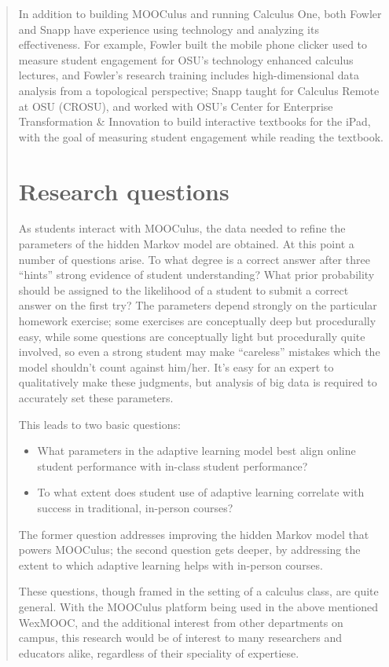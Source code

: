 \documentclass[12pt]{article}
\begin{document}
\begin{quote}
In addition to building MOOCulus and running Calculus One, both Fowler
and Snapp have experience using technology and analyzing its
effectiveness.  For example, Fowler built the mobile phone clicker
used to measure student engagement for OSU's technology enhanced
calculus lectures, and Fowler's research training includes
high-dimensional data analysis from a topological perspective; Snapp
taught for Calculus Remote at OSU (CROSU), and worked with OSU's
Center for Enterprise Transformation \& Innovation to build
interactive textbooks for the iPad, with the goal of measuring student
engagement while reading the textbook.

\section{Research questions}

As students interact with MOOCulus, the data needed to refine the
parameters of the hidden Markov model are obtained.  At this point a
number of questions arise. To what degree is a correct answer after
three ``hints'' strong evidence of student understanding?  What prior
probability should be assigned to the likelihood of a student to
submit a correct answer on the first try?  The parameters depend
strongly on the particular homework exercise; some exercises are
conceptually deep but procedurally easy, while some questions are
conceptually light but procedurally quite involved, so even a strong
student may make ``careless'' mistakes which the model shouldn't count
against him/her.  It's easy for an expert to qualitatively make these
judgments, but analysis of big data is required to accurately set
these parameters.

This leads to two basic questions:
\begin{itemize}
\item What parameters in the adaptive learning model best align online
  student performance with in-class student performance?
\item To what extent does student use of adaptive learning correlate
  with success in traditional, in-person courses?
\end{itemize}
The former question addresses improving the hidden Markov model that
powers MOOCulus; the second question gets deeper, by addressing the
extent to which adaptive learning helps with in-person courses.

These questions, though framed in the setting of a calculus class, are
quite general. With the MOOCulus platform being used in the above
mentioned WexMOOC, and the additional interest from other departments
on campus, this research would be of interest to many researchers and
educators alike, regardless of their speciality of expertiese.


\end{quote}
\end{document}

